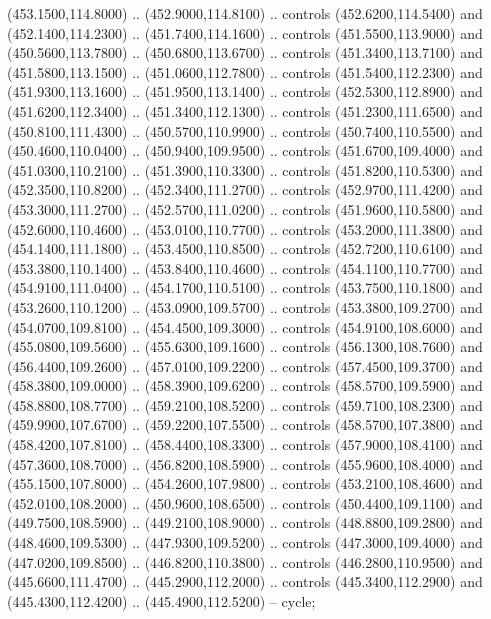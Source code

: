 {\begin{scope}[y=0.80pt, x=0.80pt, yscale=-1, xscale=1, inner sep=0pt, outer sep=0pt, #1]
      (453.1500,114.8000) .. (452.9000,114.8100) .. controls (452.6200,114.5400) and
      (452.1400,114.2300) .. (451.7400,114.1600) .. controls (451.5500,113.9000) and
      (450.5600,113.7800) .. (450.6800,113.6700) .. controls (451.3400,113.7100) and
      (451.5800,113.1500) .. (451.0600,112.7800) .. controls (451.5400,112.2300) and
      (451.9300,113.1600) .. (451.9500,113.1400) .. controls (452.5300,112.8900) and
      (451.6200,112.3400) .. (451.3400,112.1300) .. controls (451.2300,111.6500) and
      (450.8100,111.4300) .. (450.5700,110.9900) .. controls (450.7400,110.5500) and
      (450.4600,110.0400) .. (450.9400,109.9500) .. controls (451.6700,109.4000) and
      (451.0300,110.2100) .. (451.3900,110.3300) .. controls (451.8200,110.5300) and
      (452.3500,110.8200) .. (452.3400,111.2700) .. controls (452.9700,111.4200) and
      (453.3000,111.2700) .. (452.5700,111.0200) .. controls (451.9600,110.5800) and
      (452.6000,110.4600) .. (453.0100,110.7700) .. controls (453.2000,111.3800) and
      (454.1400,111.1800) .. (453.4500,110.8500) .. controls (452.7200,110.6100) and
      (453.3800,110.1400) .. (453.8400,110.4600) .. controls (454.1100,110.7700) and
      (454.9100,111.0400) .. (454.1700,110.5100) .. controls (453.7500,110.1800) and
      (453.2600,110.1200) .. (453.0900,109.5700) .. controls (453.3800,109.2700) and
      (454.0700,109.8100) .. (454.4500,109.3000) .. controls (454.9100,108.6000) and
      (455.0800,109.5600) .. (455.6300,109.1600) .. controls (456.1300,108.7600) and
      (456.4400,109.2600) .. (457.0100,109.2200) .. controls (457.4500,109.3700) and
      (458.3800,109.0000) .. (458.3900,109.6200) .. controls (458.5700,109.5900) and
      (458.8800,108.7700) .. (459.2100,108.5200) .. controls (459.7100,108.2300) and
      (459.9900,107.6700) .. (459.2200,107.5500) .. controls (458.5700,107.3800) and
      (458.4200,107.8100) .. (458.4400,108.3300) .. controls (457.9000,108.4100) and
      (457.3600,108.7000) .. (456.8200,108.5900) .. controls (455.9600,108.4000) and
      (455.1500,107.8000) .. (454.2600,107.9800) .. controls (453.2100,108.4600) and
      (452.0100,108.2000) .. (450.9600,108.6500) .. controls (450.4400,109.1100) and
      (449.7500,108.5900) .. (449.2100,108.9000) .. controls (448.8800,109.2800) and
      (448.4600,109.5300) .. (447.9300,109.5200) .. controls (447.3000,109.4000) and
      (447.0200,109.8500) .. (446.8200,110.3800) .. controls (446.2800,110.9500) and
      (445.6600,111.4700) .. (445.2900,112.2000) .. controls (445.3400,112.2900) and
      (445.4300,112.4200) .. (445.4900,112.5200) -- cycle;


\end{scope}}
